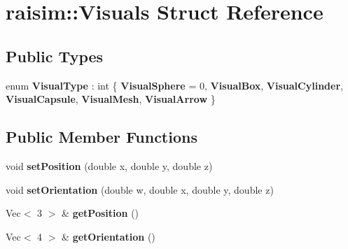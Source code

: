 \hypertarget{structraisim_1_1Visuals}{}\section{raisim\+:\+:Visuals Struct Reference}
\label{structraisim_1_1Visuals}
\subsection*{Public Types}
\begin{DoxyCompactItemize}
\item 
\mbox{\label{structraisim_1_1Visuals_ae640649156de9a1eca58386278a79d5c}} 
enum {\bfseries Visual\+Type} \+: int \{ \newline
{\bfseries Visual\+Sphere} = 0, 
{\bfseries Visual\+Box}, 
{\bfseries Visual\+Cylinder}, 
{\bfseries Visual\+Capsule}, 
\newline
{\bfseries Visual\+Mesh}, 
{\bfseries Visual\+Arrow}
 \}
\end{DoxyCompactItemize}
\subsection*{Public Member Functions}
\begin{DoxyCompactItemize}
\item 
\mbox{\label{structraisim_1_1Visuals_ad780b8f5d396aab3d3b0b0926ddc23d9}} 
void {\bfseries set\+Position} (double x, double y, double z)
\item 
\mbox{\label{structraisim_1_1Visuals_a1fbbeeaea3047625f8b3ab426f1d1e41}} 
void {\bfseries set\+Orientation} (double w, double x, double y, double z)
\item 
\mbox{\label{structraisim_1_1Visuals_a0fb2b3835c91ecaad78929ade7446259}} 
Vec$<$ 3 $>$ \& {\bfseries get\+Position} ()
\item 
\mbox{\label{structraisim_1_1Visuals_ad752dc595a1408da5d37dae470f4b155}} 
Vec$<$ 4 $>$ \& {\bfseries get\+Orientation} ()
\end{DoxyCompactItemize}
